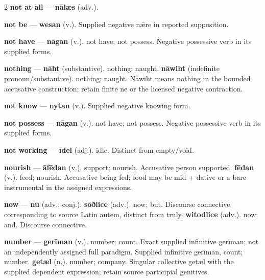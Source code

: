 \begin{multicols}{2}
\textbf{not at all} — \textbf{nālæs} (adv.).\par
\textbf{not be} — \textbf{wesan} (v.). Supplied negative nǣre in reported supposition.\par
\textbf{not have} — \textbf{nāgan} (v.). not have; not possess. Negative possessive verb in its supplied forms.\par
\textbf{nothing} — \textbf{nāht} (substantive). nothing; naught. \textbf{nāwiht} (indefinite pronoun/substantive). nothing; naught. Nāwiht means nothing in the bounded accusative construction; retain finite ne or the licensed negative contraction.\par
\textbf{not know} — \textbf{nytan} (v.). Supplied negative knowing form.\par
\textbf{not possess} — \textbf{nāgan} (v.). not have; not possess. Negative possessive verb in its supplied forms.\par
\textbf{not working} — \textbf{īdel} (adj.). idle. Distinct from empty/void.\par
\textbf{nourish} — \textbf{āfēdan} (v.). support; nourish. Accusative person supported. \textbf{fēdan} (v.). feed; nourish. Accusative being fed; food may be mid + dative or a bare instrumental in the assigned expressions.\par
\textbf{now} — \textbf{nū} (adv.; conj.).  \textbf{sōðlice} (adv.). now; but. Discourse connective corresponding to source Latin autem, distinct from truly. \textbf{witodlice} (adv.). now; and. Discourse connective.\par
\textbf{number} — \textbf{gerīman} (v.). number; count. Exact supplied infinitive gerīman; not an independently assigned full paradigm. Supplied infinitive gerīman, count; number. \textbf{getæl} (n.). number; company. Singular collective getæl with the supplied dependent expression; retain source participial genitives.\par

\end{multicols}
